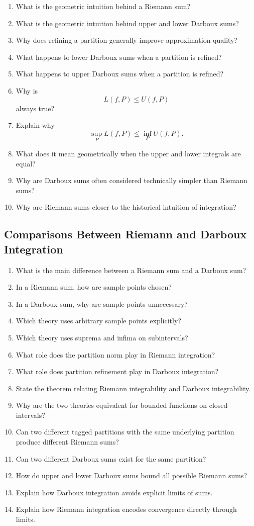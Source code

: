\begin{enumerate}[resume]
  \item What is the geometric intuition behind a Riemann sum?
  \item What is the geometric intuition behind upper and lower Darboux sums?
  \item Why does refining a partition generally improve approximation quality?
  \item What happens to lower Darboux sums when a partition is refined?
  \item What happens to upper Darboux sums when a partition is refined?
  \item Why is
    \[
      L(f,P) \le U(f,P)
    \]
    always true?
  \item Explain why
    \[
      \sup_P L(f,P) \le \inf_P U(f,P).
    \]
  \item What does it mean geometrically when the upper and lower integrals are equal?
  \item Why are Darboux sums often considered technically simpler than Riemann sums?
  \item Why are Riemann sums closer to the historical intuition of integration?
\end{enumerate}

\subsection{Comparisons Between Riemann and Darboux Integration}

\begin{enumerate}[resume]
  \item What is the main difference between a Riemann sum and a Darboux sum?
  \item In a Riemann sum, how are sample points chosen?
  \item In a Darboux sum, why are sample points unnecessary?
  \item Which theory uses arbitrary sample points explicitly?
  \item Which theory uses suprema and infima on subintervals?
  \item What role does the partition norm play in Riemann integration?
  \item What role does partition refinement play in Darboux integration?
  \item State the theorem relating Riemann integrability and Darboux integrability.
  \item Why are the two theories equivalent for bounded functions on closed intervals?
  \item Can two different tagged partitions with the same underlying partition produce different Riemann sums?
  \item Can two different Darboux sums exist for the same partition?
  \item How do upper and lower Darboux sums bound all possible Riemann sums?
  \item Explain how Darboux integration avoids explicit limits of sums.
  \item Explain how Riemann integration encodes convergence directly through limits.
\end{enumerate}


